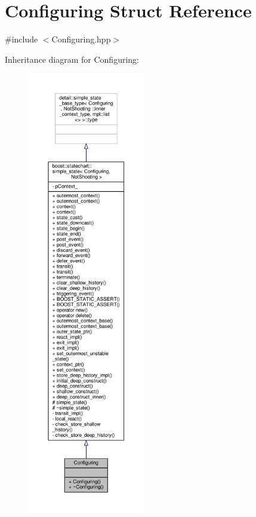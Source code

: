 \hypertarget{struct_configuring}{}\section{Configuring Struct Reference}
\label{struct_configuring}


{\ttfamily \#include $<$Configuring.\+hpp$>$}



Inheritance diagram for Configuring\+:
\nopagebreak
\begin{figure}[H]
\begin{center}
\leavevmode
\includegraphics[height=550pt]{struct_configuring__inherit__graph}
\end{center}
\end{figure}



